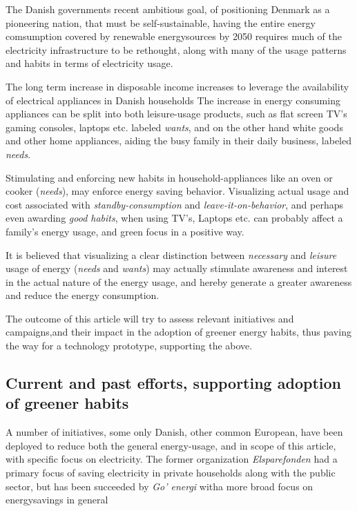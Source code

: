 \documentclass[journal]{IEEEtran}
\begin{document}
The Danish governments recent ambitious goal, of positioning Denmark as a pioneering nation, that must be self-sustainable, having the entire energy comsumption covered by renewable energysources by 2050 \cite{energipolitik_2020} requires much of the electricity infrastructure to be rethought, along with many of the usage patterns and habits in terms of electricity usage.


The long term increase in disposable income increases to leverage the availability of electrical appliances in Danish households %
The increase in energy consuming appliances can be split into both leisure-usage products, such as flat screen TV's gaming consoles, laptops etc. labeled \textit{wants}, and on the other hand white goods and other home appliances, aiding the busy family in their daily business, labeled \textit{needs}.

Stimulating and enforcing new habits in household-appliances like an oven or cooker (\textit{needs}), may enforce energy saving behavior. 
Visualizing actual usage and cost associated with \textit{standby-consumption} and \textit{leave-it-on-behavior}, and perhaps even awarding \textit{good habits}, when using TV's, Laptops etc. can probably affect a family's energy usage, and green focus in a positive way.

It is believed that visualizing a clear distinction between \textit{necessary} and \textit{leisure} usage of energy (\textit{needs} and \textit{wants}) may actually stimulate awareness and interest in the actual nature of the energy usage, and hereby generate a greater awareness and reduce the energy consumption.

The outcome of this article will try to assess relevant initiatives and campaigns,and their impact in the adoption of greener energy habits, thus paving the way for a technology prototype, supporting the above.

\subsection{Current and past efforts, supporting adoption of greener habits}
A number of initiatives, some only Danish, other common European, have been deployed to reduce both the general energy-usage, and in scope of this article, with specific focus on electricity. The former organization \textit{Elsparefonden} had a primary focus of saving electricity in private households along with the public sector, but has been succeeded by \textit{Go' energi} witha more broad focus on energysavings in general \cite{ing_elspar} 
\end{document}
